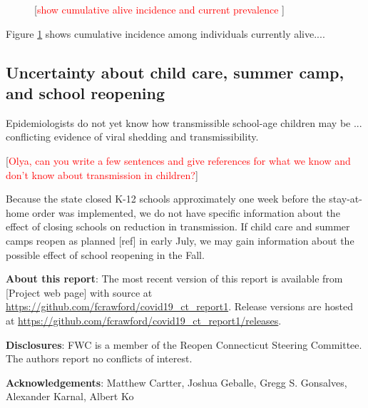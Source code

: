 \documentclass[11pt]{article}
\newcommand{\comment}[1]{[\textcolor{red}{#1}]}
\begin{document}
\begin{figure}
\centering
\caption{\comment{show cumulative alive incidence and current prevalence }}
\label{fig:cumincidence}
\end{figure}

Figure \ref{fig:cumincidence} shows cumulative incidence among individuals currently alive....



\subsection*{Uncertainty about child care, summer camp, and school reopening}

Epidemiologists do not yet know how transmissible school-age children may be ... conflicting evidence of viral shedding and transmissibility. 

\comment{Olya, can you write a few sentences and give references for what we know and don't know about transmission in children?}

Because the state closed K-12 schools approximately one week before the stay-at-home order was implemented, we do not have specific information about the effect of closing schools on reduction in transmission.  If child care and summer camps reopen as planned [ref] in early July, we may gain information about the possible effect of school reopening in the Fall.  



\textbf{About this report}: The most recent version of this report is available from [Project web page] with source at \url{https://github.com/fcrawford/covid19_ct_report1}. Release versions are hosted at \url{https://github.com/fcrawford/covid19_ct_report1/releases}. 



\textbf{Disclosures}: FWC is a member of the Reopen Connecticut Steering Committee.  The authors report no conflicts of interest. 



\textbf{Acknowledgements}:
Matthew Cartter,
Joshua Geballe,
Gregg S. Gonsalves,
Alexander Karnal,
Albert Ko 






\end{document}
